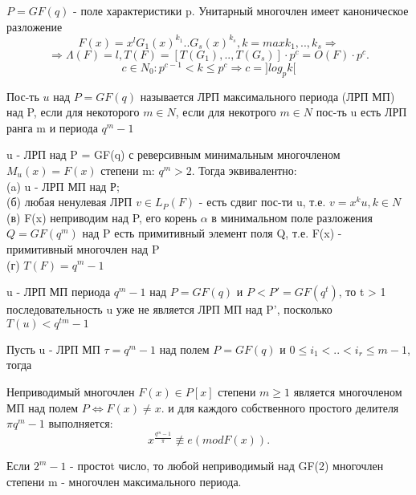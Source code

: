 \begin{proofs}
$P = GF(q)$ - поле характеристики p. Унитарный многочлен имеет каноническое разложение
$$F(x) = x^l G_1(x)^{k_1} .. G_s(x)^{k_s}, k = max{k_1,..,k_s} \Rightarrow$$
$$\Rightarrow \Lambda(F) = l, T(F) = [T(G_1),..,T(G_s)] \cdot p^c = O(F) \cdot p^c.$$ 
$$c \in N_0: p^{c-1} < k \leq p^c \Rightarrow c = ]log_p k[$$   
\end{proofs}

\begin{defs}
Пос-ть $u$ над $P = GF(q)$ называется ЛРП максимального периода (ЛРП МП) над P, если для некоторого $m \in N$, если для некотрого $m \in N$ пос-ть u есть ЛРП ранга m и периода $q^m - 1$
\end{defs}

\begin{proofs}
u - ЛРП над P = GF(q) с реверсивным минимальным многочленом $M_u(x) = F(x)$ степени m: $q^m > 2$. Тогда эквивалентно:
\\(a) u - ЛРП МП над Р;
\\(б) любая ненулевая ЛРП $v \in L_P(F)$ - есть сдвиг пос-ти u, т.е. $v = x^k u, k \in N$
\\(в) F(x) неприводим над P, его корень $\alpha$ в минимальном поле разложения $Q = GF(q^m)$ над P есть примитивный элемент поля Q, т.е. F(x) - примитивный многочлен над P
\\(г) $T(F) = q^m - 1$
\end{proofs}

\begin{defs}
u - ЛРП МП периода $q^m - 1$ над $P = GF(q)$ и $P < P' = GF(q^t)$, то t > 1 последовательность u уже не является ЛРП МП над P', посколько $T(u) < q^{tm} - 1$
\end{defs}

\begin{proofs}
Пусть u - ЛРП МП $\tau = q^m - 1$ над полем $P = GF(q)$ и $0 \leq i_1 < .. < i_r \leq m-1$, тогда   
\end{proofs}   

\begin{proofs} 
Неприводимый многочлен $F(x) \in P[x]$ степени $m \geq 1$ является многочленом МП над полем $P \Leftrightarrow F(x) \neq  x.$ и для каждого собственного простого делителя $\pi q^m - 1$ выполняется:
$$x^{\frac{q^m - 1}{\pi}} \not\equiv e (mod F(x)).$$
\end{proofs}

\begin{proofs}
Если $2^m - 1$ - простоt число, то любой неприводимый над GF(2) многочлен степени m - многочлен максимального периода.
\end{proofs} 